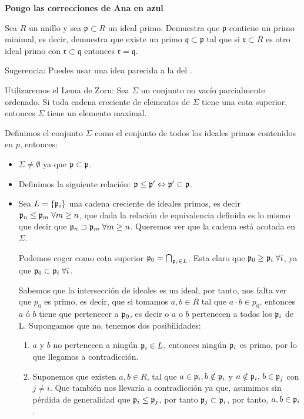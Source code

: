 \noindent {}

\textbf{Pongo las correcciones de Ana en azul}


\begin{problem} Sea $R$ un anillo y sea $\mathfrak{p} ⊂ R$ un ideal primo. Demuestra que $\mathfrak{p}$ contiene un primo minimal, es decir, demuestra que existe un primo $\mathfrak{q} ⊂ \mathfrak{p}$ tal que si $\mathfrak{r} ⊂ R$ es otro ideal primo con $\mathfrak{r} ⊂ \mathfrak{q}$ entonces $\mathfrak{r} = \mathfrak{q}$.

\textup{Sugerencia: Puedes usar una idea parecida a la del }.

\solution
{}

Utilizaremos el Lema de Zorn: Sea $\Sigma$ un conjunto no vacío parcialmente ordenado. Si toda cadena creciente de elementos de $\Sigma$ tiene una cota superior, entonces $\Sigma$ tiene un elemento maximal.

Definimos el conjunto $\Sigma$ como el conjunto de todos los ideales primos contenidos en $p$, entonces:
\begin{itemize}
	\item $\Sigma \neq \emptyset$ ya que $\mathfrak{p} \subset \mathfrak{p}$.
	\item Definimos la siguiente relación: $\mathfrak{p} \leq \mathfrak{p}' \Leftrightarrow \mathfrak{p}' \subset \mathfrak{p}$.
	\item Sea $L=\{\mathfrak{p}_i\}$ una cadena creciente de ideales primos, es decir $\mathfrak{p}_n \leq \mathfrak{p}_m\; \forall m \geq n$, que dada la relación de equivalencia definida es lo mismo que decir que $\mathfrak{p}_n \supset \mathfrak{p}_m\; \forall m \geq n$. Queremos ver que la cadena está acotada en $\Sigma$.

	Podemos coger como cota superior $\mathfrak{p}_0=\bigcap_{\mathfrak{p}_i\in L}$. Esta claro que $\mathfrak{p}_0 \geq \mathfrak{p}_i\; \forall i$, ya que $\mathfrak{p}_0 \subset \mathfrak{p}_i\;  \forall i$.

	Sabemos que la intersección de ideales es un ideal, por tanto, nos falta ver que $p_0$ es primo, es decir, que si tomamos $a,b \in R$ tal que $a\cdot b \in p_0$, entonces $a$ ó $b$ tiene que pertenecer a $\mathfrak{p}_0$, es decir o $a$ o $b$ pertenecen a todos los $\mathfrak{p}_i$ de L. Supongamos que no, tenemos dos posibilidades:
	\begin{enumerate}
		\item $a$ y $b$ no pertenecen a ningún $\mathfrak{p}_i \in L$, entonces ningún $\mathfrak{p}_i$ es primo, por lo que llegamos a contradicción.
		\item Suponemos que existen $a,b\in R$, tal que $a \in \mathfrak{p}_i, b \notin \mathfrak{p}_i$ y $a \notin \mathfrak{p}_i,\, b \in \mathfrak{p}_j$ con $j \neq i$. Que también nos llevaría a contradicción ya que, asumimos sin pérdida de generalidad que $\mathfrak{p}_i \leq \mathfrak{p}_j$, por tanto $\mathfrak{p}_j \subset \mathfrak{p}_i$, por tanto, $a,b \in \mathfrak{p}_i$.
	\end{enumerate}


\end{itemize}
\end{problem}
